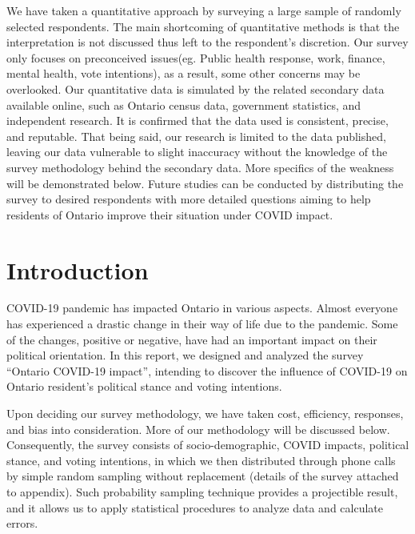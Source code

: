 \documentclass[
]{article}
\begin{document}
We have taken a quantitative approach by surveying a large sample of
randomly selected respondents. The main shortcoming of quantitative
methods is that the interpretation is not discussed thus left to the
respondent's discretion. Our survey only focuses on preconceived
issues(eg. Public health response, work, finance, mental health, vote
intentions), as a result, some other concerns may be overlooked. Our
quantitative data is simulated by the related secondary data available
online, such as Ontario census data, government statistics, and
independent research. It is confirmed that the data used is consistent,
precise, and reputable. That being said, our research is limited to the
data published, leaving our data vulnerable to slight inaccuracy without
the knowledge of the survey methodology behind the secondary data. More
specifics of the weakness will be demonstrated below. Future studies can
be conducted by distributing the survey to desired respondents with more
detailed questions aiming to help residents of Ontario improve their
situation under COVID impact.

\newpage

\hypertarget{introduction}{%
\section{Introduction}\label{introduction}}

COVID-19 pandemic has impacted Ontario in various aspects. Almost
everyone has experienced a drastic change in their way of life due to
the pandemic. Some of the changes, positive or negative, have had an
important impact on their political orientation. In this report, we
designed and analyzed the survey ``Ontario COVID-19 impact'', intending
to discover the influence of COVID-19 on Ontario resident's political
stance and voting intentions.

Upon deciding our survey methodology, we have taken cost, efficiency,
responses, and bias into consideration. More of our methodology will be
discussed below. Consequently, the survey consists of socio-demographic,
COVID impacts, political stance, and voting intentions, in which we then
distributed through phone calls by simple random sampling without
replacement (details of the survey attached to appendix). Such
probability sampling technique provides a projectible result, and it
allows us to apply statistical procedures to analyze data and calculate
errors.
\end{document}
